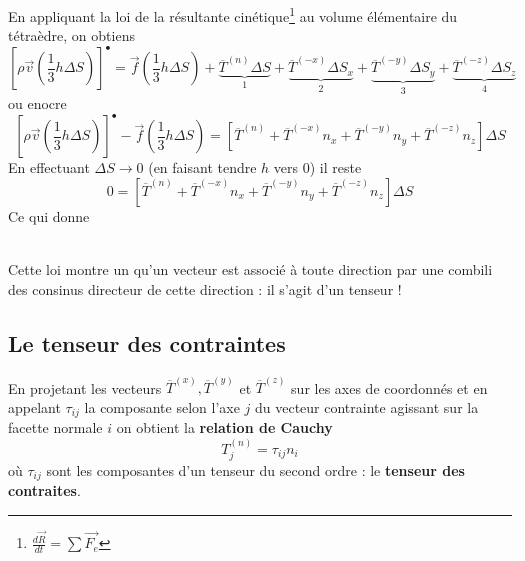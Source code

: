     En appliquant la loi de la résultante cinétique\footnote{$\frac{d\vec{R}}{dt} = \sum \vec{F_e}$} au volume 
    élémentaire du tétraèdre, on obtiens 
    \begin{equation}
    \left[\rho\vec{v}\left(\dfrac{1}{3}h\Delta S\right)\right]^{\bullet} = \vec{f}\left(\dfrac{1}{3}h\Delta S\right) +
    \underbrace{\overline{T}^{(n)}\Delta S}_{1} + \underbrace{\overline{T}^{(-x)}\Delta S_x}_{2} + 
    \underbrace{\overline{T}^{(-y)}\Delta S_y}_{3} + \underbrace{\overline{T}^{(-z)}\Delta S_z}_{4}
    \end{equation}
    ou enocre
    \begin{equation}
    \left[\rho\vec{v}\left(\dfrac{1}{3}h\Delta S\right)\right]^{\bullet} -\vec{f}\left(\dfrac{1}{3}h\Delta S\right)
    = \left[\overline{T}^{(n)}+\overline{T}^{(-x)}n_x + \overline{T}^{(-y)}n_y
    + \overline{T}^{(-z)}n_z\right]\Delta S
    \end{equation}
    En effectuant $\Delta S \rightarrow 0$ (en faisant tendre $h$ vers 0) il reste
    \begin{equation}
    0 = \left[\overline{T}^{(n)}+\overline{T}^{(-x)}n_x +\overline{T}^{(-y)}n_y+\overline{T}^{(-z)}n_z\right]
    \Delta S
    \end{equation}
    Ce qui donne\\
    
    \ 
    
    Cette loi montre un qu'un vecteur est associé à toute direction par une combili des consinus directeur de
    cette direction : il s'agit d'un tenseur !
    
    \subsection{Le tenseur des contraintes}
    En projetant les vecteurs $\overline{T}^{(x)}, \overline{T}^{(y)}$ et $\overline{T}^{(z)}$ sur les axes de
    coordonnés et en appelant $\tau_{ij}$ la composante selon l'axe $j$ du vecteur contrainte agissant sur la 
    facette normale $i$ on obtient la \textbf{relation de Cauchy}
    \begin{equation}
    T_j^{(n)} = \tau_{ij}n_i
    \end{equation}
    où $\tau_{ij}$ sont les composantes d'un tenseur du second ordre : le \textbf{tenseur des contraites}.
    

